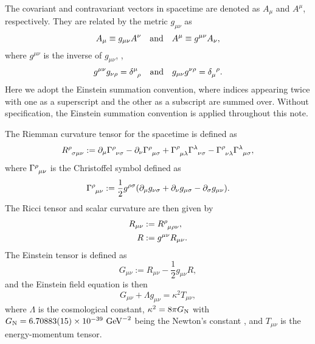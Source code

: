 \documentclass{article}
\begin{document}
            The covariant and contravariant vectors in spacetime are denoted as $A_\mu$ and $A^\mu$, respectively.
            They are related by the metric $g_{\mu\nu}$ as
            \begin{equation}
                A_\mu \equiv g_{\mu\nu} A^\nu \qand A^\mu \equiv g^{\mu\nu} A_\nu,
            \end{equation}
            where $g^{\mu\nu}$ is the inverse of $g_{\mu\nu}$, \ie,
            \begin{equation}
                g^{\mu\nu} g_{\nu\rho} = \delta\indices{^\mu_\rho} \qand g_{\mu\nu} g^{\nu\rho} = \delta\indices{_\mu^\rho}.
            \end{equation}
            Here we adopt the Einstein summation convention, where indices appearing twice with one as a superscript and the other as a subscript are summed over.
            Without specification, the Einstein summation convention is applied throughout this note.

            The Riemman curvature tensor for the spacetime is defined as \cite[Eq.~(3.4)]{Carroll:2004st}
            \begin{equation}
                R\indices{^\rho_{\sigma\mu\nu}} := \partial_\mu \Gamma\indices{^\rho_{\nu\sigma}} - \partial_\nu \Gamma\indices{^\rho_{\mu\sigma}} + \Gamma\indices{^\rho_{\mu\lambda}} \Gamma\indices{^\lambda_{\nu\sigma}} - \Gamma\indices{^\rho_{\nu\lambda}} \Gamma\indices{^\lambda_{\mu\sigma}},
            \end{equation}
            where $\Gamma\indices{^\rho_{\mu\nu}}$ is the Christoffel symbol defined as \cite[Eq.~(3.1)]{Carroll:2004st}
            \begin{equation}
                \Gamma\indices{^\rho_{\mu\nu}} := \frac{1}{2} g^{\rho\sigma} \qty(\partial_\mu g_{\nu\sigma} + \partial_\nu g_{\mu\sigma} - \partial_\sigma g_{\mu\nu}).
            \end{equation}
            The Ricci tensor and scalar curvature are then given by \cite[Eqs.~(3.144) and (3.146)]{Carroll:2004st}
            \begin{align}
                R_{\mu\nu} & := R\indices{^\rho_{\mu\rho\nu}}, \\
                R & := g^{\mu\nu} R_{\mu\nu}.
            \end{align}
            The Einstein tensor is defined as \cite[Eq.~(3.151)]{Carroll:2004st}
            \begin{equation}
                G_{\mu\nu} := R_{\mu\nu} - \frac{1}{2} g_{\mu\nu} R,
            \end{equation}
            and the Einstein field equation is then \cite[Eq.~(4.100)]{Carroll:2004st}
            \begin{equation}
                G_{\mu\nu} + \Lambda g_{\mu\nu} = \kappa^2 T_{\mu\nu},
            \end{equation}
            where $\Lambda$ is the cosmological constant, $\kappa^2 = 8 \pi G_\mathrm{N}$ \cite[Eq.~(2.1)]{Basile:2024oms} with $G_\mathrm{N} = 6.70883(15) \times 10^{-39} ~ \mathrm{G}\mathrm{eV}^{-2}$ being the Newton's constant \cite{ParticleDataGroup:2024cfk}, and $T_{\mu\nu}$ is the energy-momentum tensor.
\end{document}
